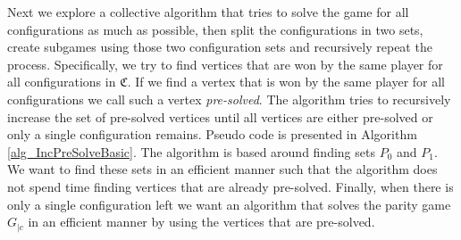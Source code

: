 Next we explore a collective algorithm that tries to solve the game for all configurations as much as possible, then split the configurations in two sets, create subgames using those two configuration sets and recursively repeat the process. Specifically, we try to find vertices that are won by the same player for all configurations in $\mathfrak{C}$. If we find a vertex that is won by the same player for all configurations we call such a vertex \textit{pre-solved}. The algorithm tries to recursively increase the set of pre-solved vertices until all vertices are either pre-solved or only a single configuration remains. Pseudo code is presented in Algorithm \ref{alg_IncPreSolveBasic}. The algorithm is based around finding sets $P_0$ and $P_1$. We want to find these sets in an efficient manner such that the algorithm does not spend time finding vertices that are already pre-solved. Finally, when there is only a single configuration left we want an algorithm that solves the parity game $G_{|c}$ in an efficient manner by using the vertices that are pre-solved.

